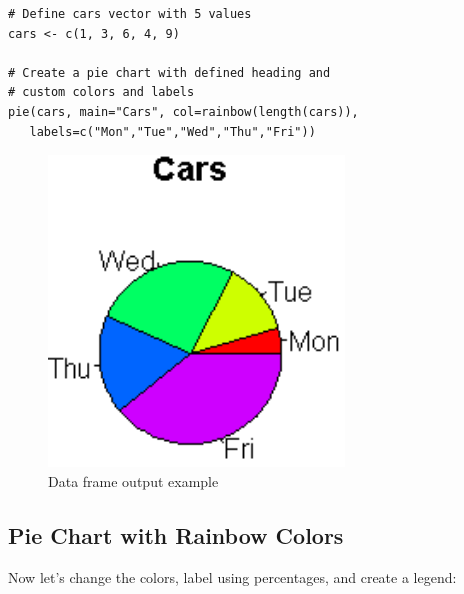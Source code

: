 \documentclass[10pt]{book}
\begin{document}
\begin{lstlisting}
# Define cars vector with 5 values
cars <- c(1, 3, 6, 4, 9)

# Create a pie chart with defined heading and
# custom colors and labels
pie(cars, main="Cars", col=rainbow(length(cars)),
   labels=c("Mon","Tue","Wed","Thu","Fri"))
\end{lstlisting}
\begin{figure}[H]
    \begin{flushleft}
        \includegraphics[width=0.7\textwidth]{pie_script2.png}
        \caption{Data frame output example}
        \label{fig:dataframe}
    \end{flushleft}
\end{figure}

\subsection*{Pie Chart with Rainbow Colors}
Now let's change the colors, label using percentages, and create a legend:
\end{document}
